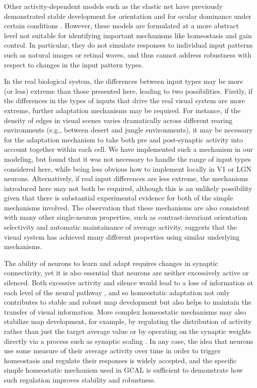 \documentclass{article}
\begin{document}
 Other activity-dependent models such as the elastic
  net have previously demonstrated stable development for orientation
  and for ocular dominance under certain conditions
  \cite{Wolfgang2011,Wolfgang2011PNAS}. However, these models are
  formulated at a more abstract level not suitable for identifying
  important mechanisms like homeostasis and gain control.  In
  particular, they do not simulate responses to individual input
  patterns such as natural images or retinal waves, and thus cannot
  address robustness with respect to changes in the input pattern
  types.

In the real biological system, the differences between input types may
be more (or less) extreme than those presented here, leading to two
possibilities.  Firstly, if the differences in the types of inputs that
drive the real visual system are more extreme, further adaptation
mechanisms may be required. For instance, if the density of edges in
visual scenes varies dramatically across different rearing
environments (e.g., between desert and jungle environments), it may be
necessary for the adaptation mechanism to take both pre and
post-synaptic activity into account together within each cell. We have implemented such
a mechanism in our modeling, but found that it was not necessary to
handle the range of input types considered here, while being less
obvious how to implement locally in V1 or LGN neurons. Alternatively, if
real input differences are less extreme, the mechanisms introduced
here may not both be required, although this is an unlikely
possibility given that there is substantial experimental evidence for
both of the simple mechanisms involved. The observation that these
mechanisms are also consistent with many other single-neuron
properties, such as contrast-invariant orientation selectivity and
automatic maintainance of average activity, suggests that the visual
system has achieved many different properties using similar underlying
mechanisms.

The ability of neurons to learn and adapt requires changes in synaptic
connectivity, yet it is also essential that neurons are neither
excessively active or silenced. Both excessive activity and silence
would lead to a loss of information at each level of the neural
pathway \citep{Turrigiano2004}, and so homeostatic adaptation not only
contributes to stable and robust map development but also helps to
maintain the transfer of visual information. More complex homeostatic
mechanisms may also stabilize map development, for example, by
regulating the distribution of activity rather than just the target
average value \citep{Triesch2005} or by operating on the synaptic
weights directly via a process such as synaptic scaling
\citep{Worgotter2011}. In any case, the idea that neurons use some
measure of their average activity over time in order to trigger
homeostasis and regulate their responses is widely accepted, and the
specific simple homeostatic mechanism used in GCAL is sufficient to
demonstrate how such regulation improves stability and robustness.
\end{document}
